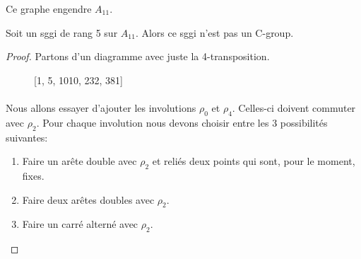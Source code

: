 \begin{lemma}
  Ce graphe engendre $A_{11}$.
\end{lemma}



\begin{theorem}
  Soit un sggi de rang 5 sur $A_{11}$. Alors ce sggi n'est pas un C-group.
\end{theorem}

\begin{proof}
  Partons d'un diagramme avec juste la 4-transposition.

  \begin{figure}[H]
    \begin{center}
      \caption{[1, 5, 1010, 232, 381]}
    \end{center}
  \end{figure}

\paragraph{}
Nous allons essayer d'ajouter les involutions $\rho_0$ et $\rho_4$. Celles-ci doivent commuter avec $\rho_2$. Pour chaque involution nous devons choisir entre les 3 possibilités suivantes:
\begin{enumerate}
  \item Faire un arête double avec $\rho_2$ et reliés deux points qui sont, pour le moment, fixes.
  \item Faire deux arêtes doubles avec $\rho_2$.
  \item Faire un carré alterné avec $\rho_2$.
\end{enumerate}


\end{proof}
